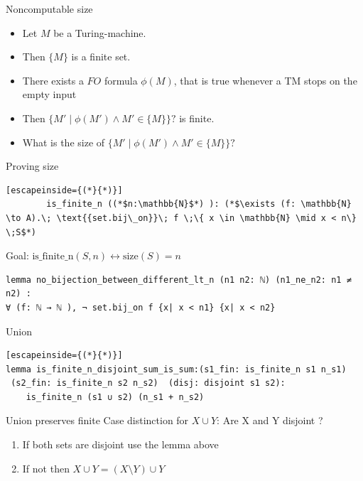 \documentclass[aspectratio=169]{beamer}
\begin{document}
    \begin{frame}{Noncomputable size}
        \begin{itemize}
            \item Let $M$ be a Turing-machine.
            \item Then $\{M\}$ is a finite set.
            \item There exists a $FO$ formula $\phi(M)$, that is true whenever a TM stops on the empty input
            \item Then $\{ M' \mid \phi (M') \land M' \in \{M\}\}? $ is finite.
            \item What is the size of $\{ M' \mid \phi (M') \land M' \in \{M\}\}? $
        \end{itemize}
    \end{frame}

\begin{frame}[fragile]{Proving size} 
    \begin{lstlisting}[escapeinside={(*}{*)}]  
        is_finite_n ((*$n:\mathbb{N}$*) ): (*$\exists (f: \mathbb{N} \to A).\; \text{{set.bij\_on}}\; f \;\{ x \in \mathbb{N} \mid x < n\} \;S$*)
    \end{lstlisting}

    Goal: $\text{is\_finite\_n}(S, n) \leftrightarrow \text{size}(S) = n$

    \begin{lstlisting}
lemma no_bijection_between_different_lt_n (n1 n2: ℕ) (n1_ne_n2: n1 ≠ n2) :
∀ (f: ℕ → ℕ ), ¬ set.bij_on f {x| x < n1} {x| x < n2}
    \end{lstlisting}
    
\end{frame}

\begin{frame}[fragile]{Union}
    \begin{lstlisting}[escapeinside={(*}{*)}]
lemma is_finite_n_disjoint_sum_is_sum:(s1_fin: is_finite_n s1 n_s1)
 (s2_fin: is_finite_n s2 n_s2)  (disj: disjoint s1 s2): 
    is_finite_n (s1 ∪ s2) (n_s1 + n_s2)
    \end{lstlisting}

    \pause
    \begin{block}{Union preserves finite}
        Case distinction for $X \cup Y$: Are X and Y disjoint ?
        \begin{enumerate}
            \item If both sets are disjoint use the lemma above
            \item If not then $X \cup Y = (X \setminus Y) \cup Y$
        \end{enumerate}
    \end{block}
\end{frame}
\end{document}
